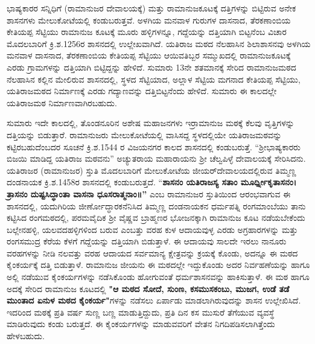 ಭಾಷ್ಯಕಾರರ ಸನ್ನಿಧಿಗೆ (ರಾಮಾನುಜರ ದೇವಾಲಯಕ್ಕೆ) ಮತ್ತು ರಾಮಾನುಜಕೂಟಕ್ಕೆ ದತ್ತಿಗಳನ್ನು ಬಿಟ್ಟಿರುವ ಅನೇಕ ಶಾಸನಗಳು ಮೇಲುಕೋಟೆಯಲ್ಲಿ ಕಂಡುಬರುತ್ತವೆ. ಅಳಗಿಯ ಮನವಾಳ ಗುರುಗಳ ದಾಸನಾದ, ತೆರಕಣಾಂಬಿಯ ಕೇತಿಯಪ್ಪ ಸೆಟ್ಟಿಯು ರಾಮಾನುಜ ಕೂಟಕ್ಕೆ ಮೂರು ಹಳ್ಳಿಗಳನ್ನೂ, ಗದ್ದೆಯನ್ನು ದತ್ತಿಯಾಗಿ ಬಿಟ್ಟನೆಂಬ ವಿಚಾರ ಮೊದಲಬಾರಿಗೆ ಕ್ರಿ.ಶ.1256ರ ಶಾಸನದಲ್ಲಿ ಉಲ್ಲೇಖವಾಗಿದೆ. ಯತಿರಾಜ ಮಠದ ನೆಲಹಾಸಿನ ಶಿಲಾಶಾಸನವು ಅಳಗಿಯ ಮನವಾಳ ದಾಸನಾದ, ತೆರಕಣಾಂಬಿಯ ಕೇತಿಯಪ್ಪ ಸೆಟ್ಟಿಯು ಆಯಿವತಿಬ್ಬರ ಸಮ್ಮುಖದಲ್ಲಿ ರಾಮಾನುಜಕೂಟಕ್ಕೆ ಎರಡು ಗ್ರಾಮಗಳನ್ನು ದತ್ತಿಯಾಗಿ ಬಿಟ್ಟಿದ್ದನ್ನು ಹೇಳಿದೆ. ಸುಮಾರು 13ನೇ ಶತಮಾನಕ್ಕೆ ಸೇರಿದ ರಾಮಾನುಜಮಠದ ನೆಲಹಾಸಿನ ಕಲ್ಲಿನ ಮೇಲಿರುವ ಶಾಸನದಲ್ಲಿ, ಸ್ಥಳದ ಸೆಟ್ಟಿಯಾದ, ಅಲ್ಲಾಳ ಸೆಟ್ಟಿಯ ಮಗನಾದ ಕೇತಿಯಪ್ಪ ಸೆಟ್ಟಿಯು, ಯತಿರಾಜಮಠದ ನಿರ್ಮಾಣಕ್ಕೆ ಎರಡು ಗದ್ಯಾಣವನ್ನು ದತ್ತಿಬಿಟ್ಟನೆಂದು ಹೇಳಿದೆ. ಸುಮಾರು ಈ ಕಾಲದಲ್ಲೇ ಯತಿರಾಜಮಠ ನಿರ್ಮಾಣವಾಗಿರಬಹುದು.

ಸುಮಾರು ಇದೇ ಕಾಲದಲ್ಲಿ, ತೊಂಡನೂರಿನ ಅಶೇಷ ಮಹಾಜನಗಳು ಇರ್ರಾಮಾನುಜ ಮಠಕ್ಕೆ ಕೆಲವು ವೃತ್ತಿಗಳನ್ನು ದತ್ತಿಯನ್ನು ಬಿಡುತ್ತಾರೆ. ರಾಮಾನುಜರು ಮೇಲುಕೋಟೆಯಲ್ಲಿ ವಾಸಿಸದ್ದ ಸ್ಥಳದಲ್ಲಿಯೇ ಯತಿರಾಜಮಠವನ್ನು ಕಟ್ಟಿರ\-ಬಹುದೆಂಬದರ ಸೂಚನೆ ಕ್ರಿ.ಶ.1544 ರ ವಿಜಯನಗರ ಕಾಲದ ಶಾಸನದಲ್ಲಿ ಕಂಡುಬರುತ್ತೆ. “ಶ‍್ರೀಭಾಷ್ಯಕಾರರು ಬಿಜಯಿ ಮಾಡಿದ್ದ ಯತಿರಾಜ ಮಠವನು” ಅಚ್ಯುತರಾಯ ಮಹಾರಾಯನು ಶ‍್ರೀ ಚೆಲ್ವಪಿಳ್ಳೆ ದೇವಾಲಯಕ್ಕೆ ಸೇರಿಸಿದನು. ಯತಿರಾಜರ (ರಾಮಾನುಜರ) ಸ್ತುತಿ ಮೊದಲಬಾರಿಗೆ ಮೇಲುಕೋಟೆಯ ಜೀಯರ್​ ದೇವಾಲಯದಲ್ಲಿರುವ ತಿಮ್ಮಣ್ಣ ದಂಡನಾಯಕ ಕ್ರಿ.ಶ.1458ರ ಶಾಸನದಲ್ಲಿ ಕಂಡುಬರುತ್ತದೆ. “\textbf{ಶಾಸನಂ ಯತಿರಾಜಸ್ಯ ಸತಾಂ ಮೂರ್ಧ್ನೀಕೃತಾಸನಂ। ತ್ರಾಸನಂ ದುಷ್ಟಸಿದ್ಧಾಂತಾ ವಾಸನಾ ಧೂಸರಾತ್ಮನಾಂ॥”} ಎಂಬ ರಾಮಾನುಜರ ಸ್ತುತಿಯಿಂದ ಆರಂಭವಾಗುವ ಈ ಶಾಸನದಲ್ಲಿ, ಯದುಗಿರಿಯ ಜೀರ್ಣೋದ್ಧಾರಕನೆನಿಸಿದ ತಿಮ್ಮಣ್ಣ ದಂಡನಾಯಕನ ಧರ್ಮಪತ್ನಿ ರಂಗಮಾಂಬೆಯು ತಾನು ಕಟ್ಟಿಸಿದ ರಂಗಮಠ\-ದಲ್ಲಿ, ಪರಮವೈದಿಕ ಶ‍್ರೀ ವೈಷ್ಣವ ಬ್ರಾಹ್ಮಣರ ಭೋಜನಕ್ಕಾಗಿ ರಾಮಾನುಜ ಕೂಟ ನಡೆಯಬೇಕೆಂದು ಬಲ್ಲೇನಹಳ್ಳಿ, ಯಲವದಹಳ್ಳಿಗಳಿಂದ ಬರುವ ಎಂಬತ್ತು ವರಹ ಕುಳ ಆದಾಯವುಳ್ಳ ಎರಡು ಅಗ್ರಹಾರಗಳನ್ನು ಮತ್ತು ರಂಗಸಮುದ್ರ ಕೆರೆಯ ಕೆಳಗೆ ಗದ್ದೆಯನ್ನು ದತ್ತಿಯಾಗಿ ಬಿಡುತ್ತಾಳೆ. ಈ ಆದಾಯವು ಸಾಲದೇ ಇರಲು ನಾನೂರು ವರಹಗಳನ್ನು ನೀಡಿ ನಲವತ್ತು ವರಹ ಆದಾಯದ ಸರ್ವಮಾನ್ಯ ಕ್ಷೇತ್ರವನ್ನು ಕ್ರಯಕ್ಕೆ ಕೊಂಡು, ಅದನ್ನೂ ಈ ಮಠದ ಕೈಂಕರ್ಯಕ್ಕೆ ದತ್ತಿ ಬಿಡುತ್ತಾಳೆ. ರಾಮಾನುಜ ಜೀಯನು ಈ ಮಠದಲ್ಲೇ ಇದ್ದುಕೊಂಡು ಅದರ ನಿರ್ವಹಣೆಯನ್ನು ಹಾಗೂ ಅಲ್ಲಿ ನಡೆಯುವ ಕೈಂಕರ್ಯಗಳನ್ನು ನಡೆಸಿಕೊಂಡು ಹೋಗುವಂತೆ ಧರ್ಮಶಾಸನವನ್ನು ಹಾಕಿಸುತ್ತಾಳೆ. ಈ ಮಠ ಹಾಗೂ ಅದಕ್ಕೆ ಸೇರಿದ ರಾಮಾನುಜ ಕೂಟದಲ್ಲಿ \textbf{"ಆ ಮಠದ ಸೋದೆ, ಸುಂಣ, ಕಸಮುಸಕಂಬು, ಮುಜಗ, ಉಡೆ ತಡೆ ಮುಂತಾದ ಏನುಳ ಮಠದ ಕೈಂಕರ್ಯ"}ಗಳನ್ನು ನಡೆಸಲು ಏರ್ಪಾಡು ಮಾಡಲಾಗಿರುವುದನ್ನು ಶಾಸನ ಉಲ್ಲೇಖಿಸಿದೆ. ಇದರಿಂದ ಮಠಕ್ಕೆ ಪ್ರತಿ ವರ್ಷ ಸುಣ್ಣ ಬಣ್ಣ ಮಾಡುತ್ತಿದ್ದುದು, ಪ್ರತಿ ದಿನ ಕಸ ಮುಸುರೆ ತೆಗೆಯುವ ವ್ಯವಸ್ಥೆ ಮಾಡಿರುವುದು ಕಂಡು ಬರುತ್ತದೆ. ಈ ಕೈಂಕರ್ಯಗಳನ್ನು ಮಾಡುವವರಿಗೆ ವೇತನ ನಿಗದಿಪಡಿಸಲಾಗಿತ್ತೆಂದು ಹೇಳಬಹುದು.

